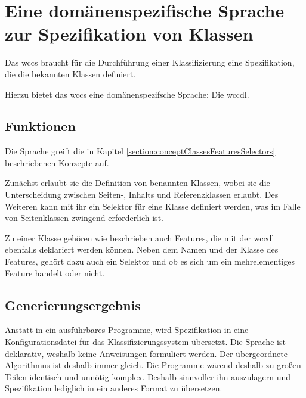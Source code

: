 \section{Eine domänenspezifische Sprache zur Spezifikation von Klassen}
    Das \gls{wccs} braucht für die Durchführung einer Klassifizierung
    eine Spezifikation, die die bekannten Klassen definiert.

    Hierzu bietet das \gls{wccs} eine domänenspezifsche Sprache:
    Die \gls{wccdl}.

    \subsection{Funktionen}
        Die Sprache greift die in Kapitel \ref{section:conceptClassesFeaturesSelectors}
        beschriebenen Konzepte auf.

        Zunächst erlaubt sie die Definition von benannten Klassen,
        wobei sie die Unterscheidung zwischen Seiten-, Inhalts und Referenzklassen
        erlaubt.
        Des Weiteren kann mit ihr ein Selektor für eine Klasse definiert werden,
        was im Falle von Seitenklassen zwingend erforderlich ist.

        Zu einer Klasse gehören wie beschrieben auch Features,
        die mit der \gls{wccdl} ebenfalls deklariert werden können.
        Neben dem Namen und der Klasse des Features, gehört dazu auch
        ein Selektor und ob es sich um ein mehrelementiges Feature handelt oder nicht.


    \subsection{Generierungsergebnis}
        \label{section:conceptDslGeneration}
        Anstatt in ein ausführbares Programme, wird Spezifikation in eine Konfigurationsdatei für
        das Klassifizierungssystem übersetzt.
        Die Sprache ist deklarativ, weshalb keine Anweisungen formuliert werden.
        Der übergeordnete Algorithmus ist deshalb immer gleich.
        Die Programme wärend deshalb zu großen Teilen identisch und unnötig komplex.
        Deshalb sinnvoller ihn auszulagern und Spezifikation lediglich in ein anderes Format zu übersetzen.

